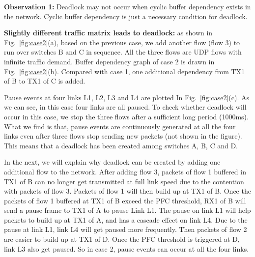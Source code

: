 %
%


\textbf{Observation 1:} Deadlock may not occur when cyclic buffer dependency exists in the network. 
Cyclic buffer dependency is just a necessary condition for deadlock.


\textbf{Slightly different traffic matrix leads to deadlock:} as shown in Fig.~\ref{fig:case2}(a), based on the previous case, we 
add another flow (flow 3) to run over switches B and C in sequence. All the three flows are UDP 
flows with infinite traffic demand. Buffer dependency graph of case 2 is drawn in Fig.~\ref{fig:case2}(b). 
Compared with case 1, one additional dependency from TX1 of B to TX1 of C is added.

Pause events at four links L1, L2, L3 and L4 are plotted In Fig.~\ref{fig:case2}(c). As we can see, in 
this case four links are all paused. To check whether deadlock will occur in this case, we stop the three 
flows after a sufficient long period (1000ms). What we find is that, pause events are continuously 
generated at all the four links even after three flows stop sending new packets (not shown in the figure). 
This means that a deadlock has been created among switches A, B, C and D.

In the next, we will explain why deadlock can be created by adding one additional flow to the network. 
After adding flow 3, packets of flow 1 buffered in TX1 of B can no longer get transmitted at full link 
speed due to the contention with packets of flow 3. Packets of flow 1 will then build up at TX1 of B. 
Once the packets of flow 1 buffered at TX1 of B exceed the PFC threshold, RX1 of B will send a pause 
frame to TX1 of A to pause Link L1. The pause on link L1 will help packets to build up at TX1 of A, 
and has a cascade effect on link L4. Due to the pause at link L1, link L4 will get paused more frequently. 
Then packets of flow 2 are easier to build up at TX1 of D. Once the PFC threshold is triggered at D, 
link L3 also get paused. So in case 2, pause events can occur at all the four links.

